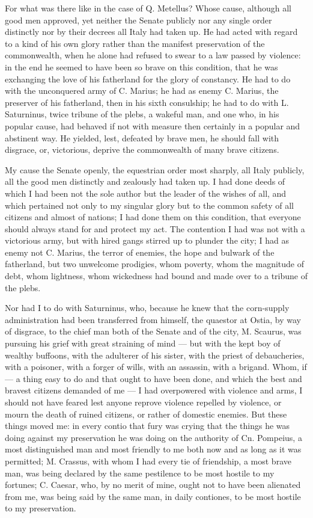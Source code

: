  For what was there like in the case of Q. Metellus? Whose cause, although all good men approved, yet neither the Senate publicly nor any single order distinctly nor by their decrees all Italy had taken up. He had acted with regard to a kind of his own glory rather than the manifest preservation of the commonwealth, when he alone had refused to swear to a law passed by violence: in the end he seemed to have been so brave on this condition, that he was exchanging the love of his fatherland for the glory of constancy. He had to do with the unconquered army of C. Marius; he had as enemy C. Marius, the preserver of his fatherland, then in his sixth consulship; he had to do with L. Saturninus, twice tribune of the plebs, a wakeful man, and one who, in his popular cause, had behaved if not with measure then certainly in a popular and abstinent way. He yielded, lest, defeated by brave men, he should fall with disgrace, or, victorious, deprive the commonwealth of many brave citizens.

 My cause the Senate openly, the equestrian order most sharply, all Italy publicly, all the good men distinctly and zealously had taken up. I had done deeds of which I had been not the sole author but the leader of the wishes of all, and which pertained not only to my singular glory but to the common safety of all citizens and almost of nations; I had done them on this condition, that everyone should always stand for and protect my act. The contention I had was not with a victorious army, but with hired gangs stirred up to plunder the city; I had as enemy not C. Marius, the terror of enemies, the hope and bulwark of the fatherland, but two unwelcome prodigies, whom poverty, whom the magnitude of debt, whom lightness, whom wickedness had bound and made over to a tribune of the plebs.

 Nor had I to do with Saturninus, who, because he knew that the corn-supply administration had been transferred from himself, the quaestor at Ostia, by way of disgrace, to the chief man both of the Senate and of the city, M. Scaurus, was pursuing his grief with great straining of mind --- but with the kept boy of wealthy buffoons, with the adulterer of his sister, with the priest of debaucheries, with a poisoner, with a forger of wills, with an assassin, with a brigand. Whom, if --- a thing easy to do and that ought to have been done, and which the best and bravest citizens demanded of me --- I had overpowered with violence and arms, I should not have feared lest anyone reprove violence repelled by violence, or mourn the death of ruined citizens, or rather of domestic enemies. But these things moved me: in every contio that fury was crying that the things he was doing against my preservation he was doing on the authority of Cn. Pompeius, a most distinguished man and most friendly to me both now and as long as it was permitted; M. Crassus, with whom I had every tie of friendship, a most brave man, was being declared by the same pestilence to be most hostile to my fortunes; C. Caesar, who, by no merit of mine, ought not to have been alienated from me, was being said by the same man, in daily contiones, to be most hostile to my preservation.

